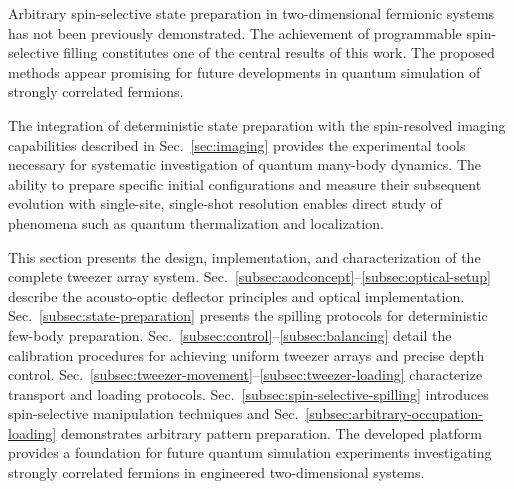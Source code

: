 Arbitrary spin-selective state preparation in two-dimensional fermionic systems has not been previously demonstrated. The achievement of programmable spin-selective filling constitutes one of the central results of this work. The proposed methods appear promising for future developments in quantum simulation of strongly correlated fermions.

The integration of deterministic state preparation with the spin-resolved imaging capabilities described in Sec.~\ref{sec:imaging} provides the experimental tools necessary for systematic investigation of quantum many-body dynamics. The ability to prepare specific initial configurations and measure their subsequent evolution with single-site, single-shot resolution enables direct study of phenomena such as quantum thermalization and localization. 

This section presents the design, implementation, and characterization of the complete tweezer array system. Sec.~\ref{subsec:aodconcept}--\ref{subsec:optical-setup} describe the acousto-optic deflector principles and optical implementation. Sec.~\ref{subsec:state-preparation} presents the spilling protocols for deterministic few-body preparation. Sec.~\ref{subsec:control}--\ref{subsec:balancing} detail the calibration procedures for achieving uniform tweezer arrays and precise depth control. Sec.~\ref{subsec:tweezer-movement}--\ref{subsec:tweezer-loading} characterize transport and loading protocols. Sec.~\ref{subsec:spin-selective-spilling} introduces spin-selective manipulation techniques and Sec.~\ref{subsec:arbitrary-occupation-loading} demonstrates arbitrary pattern preparation. The developed platform provides a foundation for future quantum simulation experiments investigating strongly correlated fermions in engineered two-dimensional systems.
